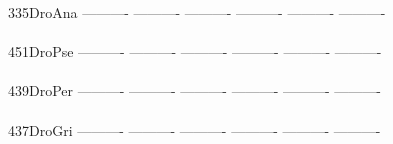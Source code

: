 \documentclass[11pt,twoside,reqno,a4paper]{article}
\begin{document}
{335\hspace*{1\charwidth}DroAna	----------	----------	----------	----------	----------	----------	\\
\hspace*{4\charwidth}\hspace*{7\charwidth}\hspace*{1\charwidth}\hspace*{1\charwidth}\hspace*{1\charwidth}\hspace*{1\charwidth}\hspace*{1\charwidth}\hspace*{1\charwidth}\\
451\hspace*{1\charwidth}DroPse	----------	----------	----------	----------	----------	----------	\\
\hspace*{4\charwidth}\hspace*{7\charwidth}\hspace*{1\charwidth}\hspace*{1\charwidth}\hspace*{1\charwidth}\hspace*{1\charwidth}\hspace*{1\charwidth}\hspace*{1\charwidth}\\
439\hspace*{1\charwidth}DroPer	----------	----------	----------	----------	----------	----------	\\
\hspace*{4\charwidth}\hspace*{7\charwidth}\hspace*{1\charwidth}\hspace*{1\charwidth}\hspace*{1\charwidth}\hspace*{1\charwidth}\hspace*{1\charwidth}\hspace*{1\charwidth}\\
437\hspace*{1\charwidth}DroGri	----------	----------	----------	----------	----------	----------	\\
\hspace*{4\charwidth}\hspace*{7\charwidth}\hspace*{1\charwidth}\hspace*{1\charwidth}\hspace*{1\charwidth}\hspace*{1\charwidth}\hspace*{1\charwidth}\hspace*{1\charwidth}\\
}
\end{document}
